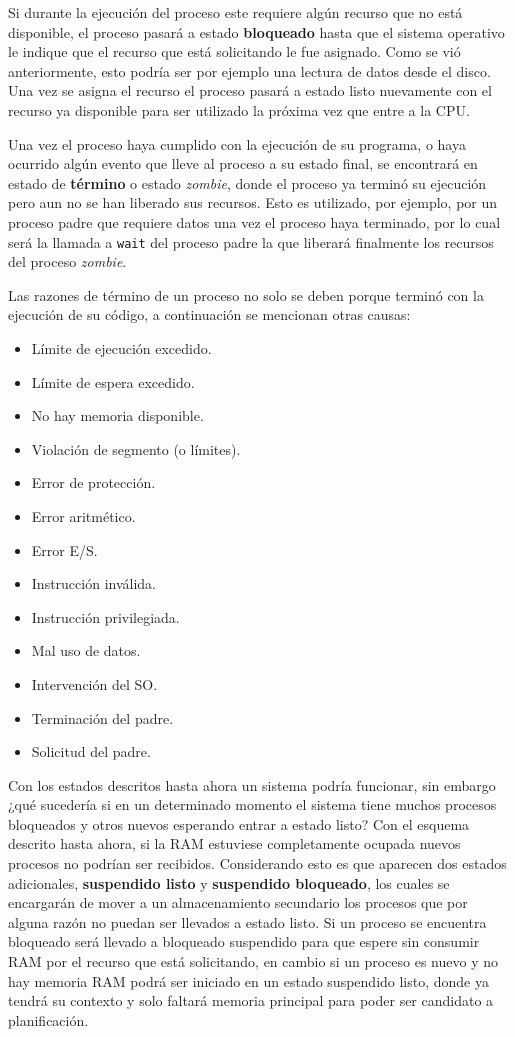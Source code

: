 Si durante la ejecución del proceso este requiere algún recurso que no está
disponible, el proceso pasará a estado \textbf{bloqueado} hasta que el sistema
operativo le indique que el recurso que está solicitando le fue asignado. Como
se vió anteriormente, esto podría ser por ejemplo una lectura de datos desde el
disco. Una vez se asigna el recurso el proceso pasará a estado listo nuevamente
con el recurso ya disponible para ser utilizado la próxima vez que entre a la
CPU.

Una vez el proceso haya cumplido con la ejecución de su programa, o haya
ocurrido algún evento que lleve al proceso a su estado final, se encontrará en
estado de \textbf{término} o estado \textit{zombie}, donde el proceso ya terminó
su ejecución pero aun no se han liberado sus recursos. Esto es utilizado, por
ejemplo, por un proceso padre que requiere datos una vez el proceso haya
terminado, por lo cual será la llamada a \texttt{wait} del proceso padre la que
liberará finalmente los recursos del proceso \textit{zombie}.

Las razones de término de un proceso no solo se deben porque terminó con la
ejecución de su código, a continuación se mencionan otras causas:
\begin{itemize}
	\item Límite de ejecución excedido.
	\item Límite de espera excedido.
	\item No hay memoria disponible.
	\item Violación de segmento (o límites).
	\item Error de protección.
	\item Error aritmético.
	\item Error E/S.
	\item Instrucción inválida.
	\item Instrucción privilegiada.
	\item Mal uso de datos.
	\item Intervención del SO.
	\item Terminación del padre.
	\item Solicitud del padre.
\end{itemize}

Con los estados descritos hasta ahora un sistema podría funcionar, sin embargo
¿qué sucedería si en un determinado momento el sistema tiene muchos procesos
bloqueados y otros nuevos esperando entrar a estado listo? Con el esquema
descrito hasta ahora, si la RAM estuviese completamente ocupada nuevos procesos
no podrían ser recibidos. Considerando esto es que aparecen dos estados
adicionales, \textbf{suspendido listo} y \textbf{suspendido bloqueado}, los
cuales se encargarán de mover a un almacenamiento secundario los procesos que
por alguna razón no puedan ser llevados a estado listo. Si un proceso se
encuentra bloqueado será llevado a bloqueado suspendido para que espere sin
consumir RAM por el recurso que está solicitando, en cambio si un proceso es
nuevo y no hay memoria RAM podrá ser iniciado en un estado suspendido listo,
donde ya tendrá su contexto y solo faltará memoria principal para poder ser
candidato a planificación.

